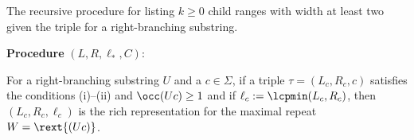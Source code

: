\begin{algorithm}[h]
  \caption{
    The recursive procedure for listing $k\ge 0$ child ranges with width at least two given the triple for a right-branching substring. 
  }\label{algo:BranchRepeats}
  \textbf{Procedure} $(L, R, \ell_*, C)$:\\  
\end{algorithm}

  \begin{lemma}
For a right-branching substring $U$ and a $c\in \Sigma$, if a triple $\tau = (L_c, R_c, c)$ satisfies the conditions (i)--(ii) and $\occ(Uc)\ge 1$ and if $\ell_c := \lcpmin(L_c, R_c)$, then $(L_c, R_c, \ell_c)$ is the rich representation for the maximal repeat $W = \rext{(Uc)}$. 
\end{lemma}





